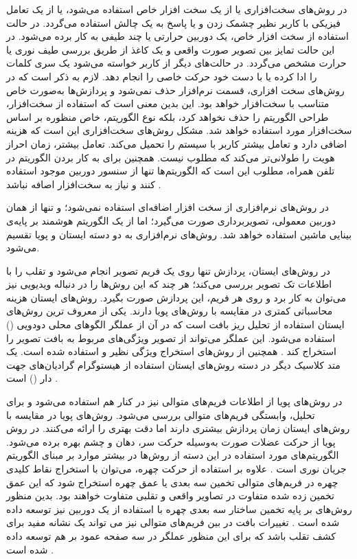 در روش‌های سخت‌افزاری یا از یک سخت افزار خاص استفاده می‌شود، یا از یک تعامل فیزیکی با کاربر نظیر چشمک زدن و یا پاسخ به یک چالش استفاده می‌گردد.
در حالت استفاده از سخت افزار خاص، یک دوربین حرارتی یا چند طیفی به کار برده می‌شود. در این حالت تمایز بین تصویر صورت واقعی و یک کاغذ از طریق بررسی طیف نوری یا حرارت مشخص می‌گردد. در حالت‌های دیگر از کاربر خواسته می‌شود یک سری کلمات را ادا کرده یا با دست خود حرکت خاصی را انجام دهد.
لازم به ذکر است که در روش‌های سخت افزاری، قسمت نرم‌افزار حذف نمی‌شود و پردازش‌ها به‌صورت خاص متناسب با سخت‌افزار خواهد بود. این بدین معنی است که استفاده از سخت‌افزار، طراحی الگوریتم را حذف نخواهد کرد، بلکه نوع الگوریتم، خاص منظوره بر اساس سخت‌افزار مورد استفاده خواهد شد.
مشکل روش‌های سخت‌افزاری این است که هزینه اضافی دارد و تعامل بیشتر کاربر با سیستم را تحمیل می‌کند. تعامل بیشتر، زمان احراز هویت را طولانی‌تر می‌کند که مطلوب نیست. همچنین برای به کار بردن الگوریتم در تلفن همراه، مطلوب این است که الگوریتم‌ها تنها از سنسور دوربین موجود استفاده کنند و نیاز به سخت‌افزار اصافه نباشد
\cite{ramachandra2017presentation}.

در روش‌های نرم‌افزاری از سخت افزار اضافه‌ای استفاده نمی‌شود؛ و تنها از همان دوربین معمولی، تصویربرداری صورت می‌گیرد؛ اما از یک الگوریتم هوشمند بر پایه‌ی بینایی ماشین استفاده خواهد شد. روش‌های نرم‌افزاری به دو دسته ایستان و پویا تقسیم می‌شود.

در روش‌های ایستان، پردازش تنها روی یک فریم تصویر انجام می‌شود و تقلب را با اطلاعات تک تصویر بررسی می‌کند؛ هر چند که این روش‌ها را در دنباله ویدیویی نیز می‌توان به کار برد و روی هر فریم، این پردازش صورت بگیرد. روش‌های ایستان هزینه محاسباتی کمتری در مقایسه با روش‌های پویا دارند.  
یکی از معروف ترین روش‌های ایستان استفاده از تحلیل ریز بافت
 است که در آن از عملگر الگو‌های محلی دودویی 
 () 
 استفاده می‌شود. این عملگر می‌تواند از تصویر ویژگی‌های مربوط به بافت تصویر را استخراج کند
 \cite{maatta2011face,chingovska2012effectiveness}.
 همچنین از روش‌های استخراج ویژگی نظیر 
  \cite{7487030}
 و 
  \cite{7748511}
 استفاده شده است.
 یک متد کلاسیک دیگر در دسته روش‌های ایستان استفاده از هیستوگرام گرادیان‌های جهت دار
 () 
 است
 \cite{schwartz2011face,komulainen2013context,yang2013face}.

در روش‌های پویا از اطلاعات فریم‌های متوالی نیز در کنار هم استفاده می‌شود و برای تحلیل، وابستگی فریم‌های متوالی بررسی می‌شود. روش‌های پویا در مقایسه با روش‌های ایستان زمان پردازش بیشتری دارند اما دقت بهتری را ارائه می‌کنند. 
در روش پویا از حرکت عضلات صورت به‌وسیله حرکت سر، دهان و چشم بهره برده می‌شود. الگوریتم‌های مورد استفاده در این دسته از روش‌ها در بیشتر موارد بر مبنای الگوریتم جریان نوری 
است
\cite{yin2016face, anjos2014motion}.
علاوه بر استفاده از حرکت چهره، می‌توان با استخراج نقاط کلیدی چهره در فریم‌های متوالی تخمین سه بعدی یا عمق چهره استخراج شود که این عمق تخمین زده شده متفاوت در تصاویر واقعی و تقلبی متفاوت خواهند بود. بدین منظور روش‌های بر پایه تخمین ساختار سه بعدی چهره با استفاده از یک دوربین نیز توسعه داده شده است
\cite{wang2013face,de2012moving}.
 تغییرات بافت در بین فریم‌های متوالی نیز می ‌تواند یک نشانه مفید برای کشف تقلب باشد که برای این منظور عملگر 
در سه صفحه عمود بر هم توسعه داده شده است
\cite{freitas2012lbp}.
